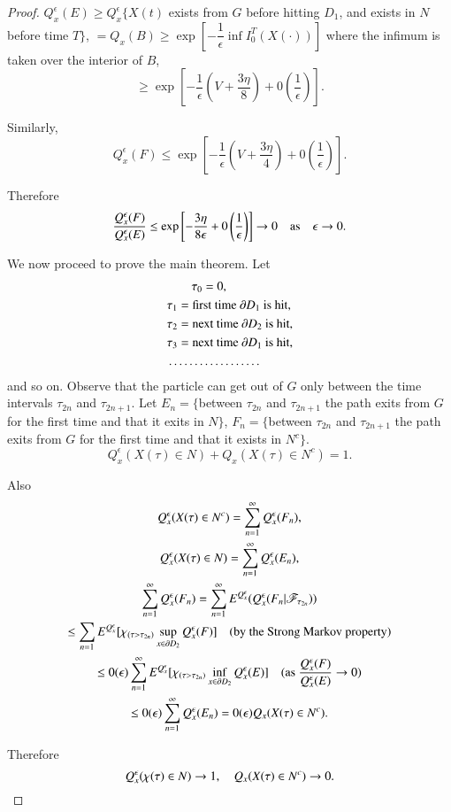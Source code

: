 \begin{proof}
$Q^{\epsilon}_{x}(E)\geq Q^{\epsilon}_{x}\{X(t)$ exists from $G$
  before hitting $D_{1}$, and exists in $N$ before time $T\}$,
  $=Q_{x}(B)\geq \exp [-\dfrac{1}{\epsilon}\inf I^{T}_{0}(X(\cdot))]$
  where the infimum is taken over the interior of $B$,
$$
\geq \exp \left[-\frac{1}{\epsilon}\left(V+\frac{3\eta}{8}\right)+0\left(\frac{1}{\epsilon}\right)\right].
$$

Similarly,
$$
Q^{\epsilon}_{x}(F)\leq \exp
\left[-\frac{1}{\epsilon}\left(V+\dfrac{3\eta}{4}\right)+0\left(\frac{1}{\epsilon}\right)\right]. 
$$

Therefore
$$
\frac{Q^{\epsilon}_{x}(F)}{Q^{\epsilon}_{x}(E)}\leq \exp
\left[-\frac{3\eta}{8\epsilon}+0\left(\frac{1}{\epsilon}\right)\right]\to
0\quad\text{as}\quad \epsilon\to 0.
$$

We now proceed to prove the main theorem. Let
\begin{align*}
& \qquad \tau_{0}=0,\\
& \tau_{1}=\text{first time~ } \partial D_{1}\text{~ is hit},\\
& \tau_{2}=\text{next time~ }\partial D_{2}\text{~ is hit},\\
& \tau_{3}=\text{next time~ }\partial D_{1}\text{~ is hit},\\
& \ldots\ldots\ldots\ldots\ldots\ldots 
\end{align*}
and so on. Observe that the particle can get out of $G$ only between
the time intervals $\tau_{2n}$ and $\tau_{2n+1}$. Let
$E_{n}=\{$between $\tau_{2n}$ and $\tau_{2n+1}$ the path exits from
$G$ for the first time and that it exits in $N\}$,\pageoriginale 
$F_{n}=\{$between
$\tau_{2n}$ and $\tau_{2n+1}$ the path exits from $G$ for the first
time and that it exists in $N^{c}\}$.
$$
Q^{\epsilon}_{x}(X(\tau)\in N)+Q_{x}(X(\tau)\in N^{c})=1.
$$

Also
\begin{gather*}
Q^{\epsilon}_{x}(X(\tau)\in
N^{c})=\sum\limits^{\infty}_{n=1}Q^{\epsilon}_{x}(F_{n}),\\
Q^{\epsilon}_{x}(X(\tau)\in
N)=\sum\limits^{\infty}_{n=1}Q^{\epsilon}_{x}(E_{n}),\\ 
\sum\limits^{\infty}_{n=1}Q^{\epsilon}_{x}(F_{n})=\sum\limits^{\infty}_{n=1}E^{Q^{\epsilon}_{x}}(Q^{\epsilon}_{x}(F_{n}|\mathscr{F}_{\tau_{2n}}))\\
\leq
\sum\limits_{n=1}E^{Q^{\epsilon}_{x}}[\chi_{(\tau>\tau_{2n})}\sup\limits_{x\in
    \partial D_{2}}Q^{\epsilon}_{x}(F)]\quad\text{(by the Strong Markov
  property)}\\
\leq
0(\epsilon)\sum\limits^{\infty}_{n=1}E^{Q^{\epsilon}_{x}}[\chi_{(\tau>\tau_{2n})}\inf\limits_{x\in
    \partial D_{2}}Q^{\epsilon}_{x}(E)]\quad(\text{as~
}\frac{Q^{\epsilon}_{x}(F)}{Q^{\epsilon}_{x}(E)}\to 0)\\
\leq
0(\epsilon)\sum\limits^{\infty}_{n=1}Q^{\epsilon}_{x}(E_{n})=0(\epsilon)Q_{x}(X(\tau)\in N^{c}). 
\end{gather*}

Therefore
$$
Q^{\epsilon}_{x}(\chi(\tau)\in N)\to 1,\quad Q_{x}(X(\tau)\in N^{c})\to
0.
$$
\end{proof}


